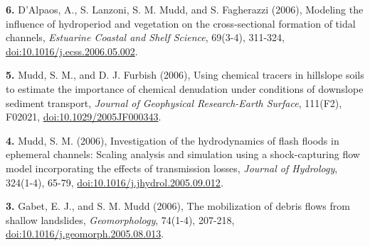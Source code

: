 \documentclass[10pt, a4paper]{article}
\newcommand{\years}[1]{\marginnote{\scriptsize #1}}
\begin{document}
\years{2006}\hangindent=0.7cm\textbf{6.} D'Alpaos, A., S. Lanzoni, S. M. Mudd, and S. Fagherazzi (2006), Modeling the influence of hydroperiod and vegetation on the cross-sectional formation of tidal channels, \textit{Estuarine Coastal and Shelf Science}, 69(3-4), 311-324, \href{http://dx.doi.org/doi:10.1016/j.ecss.2006.05.002}{doi:10.1016/j.ecss.2006.05.002}.\par
\hangindent=0.7cm\textbf{5.} Mudd, S. M., and D. J. Furbish (2006), Using chemical tracers in hillslope soils to estimate the importance of chemical denudation under conditions of downslope sediment transport, \textit{Journal of Geophysical Research-Earth Surface}, 111(F2), F02021, \href{http://dx.doi.org/doi:10.1029/2005JF000343}{doi:10.1029/2005JF000343}.\par
\hangindent=0.7cm\textbf{4.} Mudd, S. M. (2006), Investigation of the hydrodynamics of flash floods in ephemeral channels: Scaling analysis and simulation using a shock-capturing flow model incorporating the effects of transmission losses, \textit{Journal of Hydrology}, 324(1-4), 65-79, \href{http://dx.doi.org/doi:10.1016/j.jhydrol.2005.09.012}{doi:10.1016/j.jhydrol.2005.09.012}.\par
{}\par
{}\par 
\hangindent=0.7cm\textbf{3.} Gabet, E. J., and S. M. Mudd (2006), The mobilization of debris flows from shallow landslides, \textit{Geomorphology}, 74(1-4), 207-218, \href{http://dx.doi.org/doi:10.1016/j.geomorph.2005.08.013}{doi:10.1016/j.geomorph.2005.08.013}.\par
\end{document}
